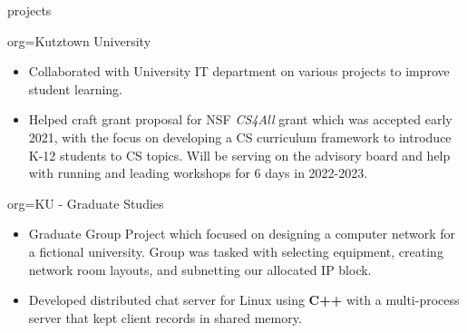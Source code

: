 \documentclass{resume}
\begin{document}
\begin{ResumeSection}{projects}
    \begin{ResumeSubsection}{org={Kutztown University}}
        \begin{itemize}
            \item Collaborated with University IT department on various projects to improve student learning. 
            \item Helped craft grant proposal for NSF \emph{CS4All} grant which was accepted early 2021,
            with the focus on developing a CS curriculum framework to introduce K-12 students to CS topics.  
            Will be serving on the advisory board and help with running and leading workshops for 6 days 
            in 2022-2023. 
        \end{itemize}
    \end{ResumeSubsection}
    \begin{ResumeSubsection}{org={KU - Graduate Studies}}
        \begin{itemize}
            \item Graduate Group Project which focused on designing a computer network for a fictional university. Group was tasked with 
            selecting equipment, creating network room layouts, and subnetting our allocated IP block. 
            \item Developed distributed chat server for Linux using \textbf{C++} with a multi-process server that kept client records in shared memory.
        \end{itemize}
    \end{ResumeSubsection}
\end{ResumeSection}
\end{document}
